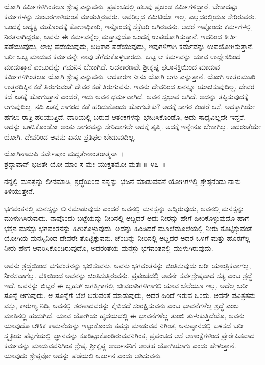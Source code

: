 ಯೋಗಿ ಕರ್ಮಿಗಳಿಗಿಂತಲೂ ಶ್ರೇಷ್ಠ ಎನ್ನುವನು. ಪ್ರಪಂಚದಲ್ಲಿ ಹಲವು ಪ್ರಚಂಡ ಕರ್ಮಿ\-ಗಳಿದ್ದಾರೆ. ಬೇಕಾದಷ್ಟು ಕರ್ಮಗಳನ್ನು ಸುಂಟರಗಾಳಿಯಂತೆ ಮಾಡುತ್ತಿರುವರು. ಅವರಿಲ್ಲದ ಕಮಿಟಿಯೇ ಇಲ್ಲ. ಎಲ್ಲದರಲ್ಲಿಯೂ ಸೇರಿರುವರು. ಒಂದಕ್ಕೆ ಅಧ್ಯಕ್ಷ ಮತ್ತೊಂದಕ್ಕೆ ಕೋಶಾಧಿಕಾರಿ, ಇನ್ನೊಂದಕ್ಕೆ ಸೆಕ್ರೆಟರಿ ಆಗಿರುವನು. ಆದರೆ ಇಷ್ಟೊಂದು ಕರ್ಮಗಳಲ್ಲಿ ನಿರತನಾಗಿದ್ದರೂ, ಅವನು ಈ ಕರ್ಮವನ್ನೆಲ್ಲ ಮತ್ತಾವುದೊ ಒಂದಕ್ಕೆ ಉಪಯೋಗಿಸುತ್ತಾನೆ. ಇದರಿಂದ ಕೀರ್ತಿ ಪಡೆಯುವುದು, ಲಾಭ ಪಡೆಯುವುದು, ಅಧಿಕಾರ ಪಡೆಯುವುದು, ಇವುಗಳಿಗಾಗಿ ಕರ್ಮವನ್ನು ಉಪಯೋಗಿಸುತ್ತಾನೆ. ಬರೀ ಒಬ್ಬ ಮಾಡುವ ಕರ್ಮವನ್ನೇ ನಾವು ತೆಗೆದುಕೊಳ್ಳಬಾರದು. ಒಬ್ಬ ಆ ಕರ್ಮವನ್ನು ಯಾವ ಉದ್ದೇಶದಿಂದ ಮಾಡುತ್ತಾನೆ ಎಂಬುದನ್ನು ಗಮನಿಸ ಬೇಕಾಗಿದೆ. ಆದಕಾರಣವೇ ಶ‍್ರೀಕೃಷ್ಣ ಫಲಾಸಕ್ತಿಯಿಂದ ಮಾಡುವ ಕರ್ಮಿಗಳಿಗಿಂತಲೂ ಯೋಗಿ ಶ್ರೇಷ್ಠ ಎನ್ನುವನು. ಆದಕಾರಣ ನೀನು ಯೋಗಿ ಆಗು ಎನ್ನುತ್ತಾನೆ. ಯೋಗಿ ಉತ್ತರಮುಖಿ ಉತ್ತರದಿಕ್ಕಿನ ಕಡೆ ತಿರುಗುವಂತೆ ದೇವರ ಕಡೆ ತಿರುಗುವನು. ಇವನು ದೇವರಿಂದ ಏನನ್ನೂ ಯಾಚಿಸುವುದಿಲ್ಲ. ದೇವರ ಕಡೆ ಏತಕ್ಕೆ ಹೋಗುತ್ತಾನೆ ಎಂದರೆ, ಇದು ಅವನ ಧರ್ಮವಾಗಿದೆ. ಅವನ ಸ್ವಭಾವ ಆಗಿದೆ. ಅದನ್ನು ತಪ್ಪಿಸುವುದಕ್ಕೆ ಆಗುವುದಿಲ್ಲ. ನದಿ ಏತಕ್ಕೆ ಸಾಗರದ ಕಡೆ ಹರಿದುಕೊಂಡು ಹೋಗಬೇಕು? ಅದಕ್ಕೆ ಸಾಗರ ಕಂಡರೆ ಆಸೆ. ಅದಕ್ಕಾಗಿಯೇ ಹಗಲು ರಾತ್ರಿ ಹರಿಯುತ್ತಿದೆ. ದಾರಿಯಲ್ಲಿ ಬರುವ ಆತಂಕಗಳನ್ನು ಭೇದಿಸಿಕೊಂಡೊ, ಅದು ಸಾಧ್ಯವಿಲ್ಲದೇ ಇದ್ದರೆ, ಅದನ್ನು ಬಳಸಿಕೊಂಡೋ ಅಂತು ಸಾಗರವನ್ನು ಸೇರಿದಾಗಲೇ ಅದಕ್ಕೆ ತೃಪ್ತಿ. ಅದಕ್ಕೆ ಇನ್ನೇನೂ ಬೇಕಾಗಿಲ್ಲ. ಅದರಂತೆಯೇ ಯೋಗಿ. ದೇವರಿಂದ ಅವನು ಏನೂ ಪ್ರತಿಫಲ ಬೇಡುವುದಿಲ್ಲ.

\begin{shloka}
ಯೋಗಿನಾಮಪಿ ಸರ್ವೇಷಾಂ ಮದ್ಗತೇನಾಂತರಾತ್ಮನಾ~।\\ಶ್ರದ್ಧಾವಾನ್ ಭಜತೇ ಯೋ ಮಾಂ ಸ ಮೇ ಯುಕ್ತತಮೋ ಮತಃ \hfill॥ ೪೭~॥
\end{shloka}

\begin{artha}
ನನ್ನಲ್ಲಿ ಮನಸ್ಸನ್ನು ಲೀನಮಾಡಿ, ಶ್ರದ್ಧೆಯಿಂದ ನನ್ನನ್ನು ಭಜನೆ ಮಾಡುವವನೆ ಯೋಗಿಗಳಲ್ಲಿ ಶ್ರೇಷ್ಠನೆಂದು ನಾನು ತಿಳಿಯುತ್ತೇನೆ.
\end{artha}

ಭಗವಂತನಲ್ಲಿ ಮನಸ್ಸನ್ನು ಲೀನಮಾಡುವುದು ಎಂದರೆ ಅವನಲ್ಲಿ ಮನಸ್ಸನ್ನು ಅದ್ದಿರುವುದು, ಅವನಲ್ಲಿ ಮನಸ್ಸನ್ನು ಮುಳುಗಿಸಿರುವುದು. ನಾವೊಂದು ಬಟ್ಟೆಯನ್ನು ನೀರಿನಲ್ಲಿ ಅದ್ದಿದರೆ ಅದು ನೀರನ್ನು ಹೇಗೆ ಹೀರಿಕೊಳ್ಳುವುದೊ ಹಾಗೆ ಭಕ್ತನ ಮನಸ್ಸು ಭಗವಂತನನ್ನು ಹೀರಿಕೊಳ್ಳುವುದು. ಅದನ್ನು ಹಿಂಡಿದರೆ ಮೂಲೆಮೂಲೆಯಲ್ಲಿ ನೀರು ತೊಟ್ಟಿಕ್ಕುವಂತೆ ಯೋಗಿಯ ಮನಸ್ಸಿನಿಂದ ದೇವರೇ ತೊಟ್ಟಿಕ್ಕುವನು. ಚೆಂಬನ್ನು ನೀರಿನಲ್ಲಿ ಅದ್ದಿದರೆ ಅದರ ಒಳಗೆ ಮತ್ತು ಹೊರಗೆಲ್ಲ ನೀರು ಹೇಗೆ ಆವರಿಸಿಕೊಂಡಿರುವುದೊ, ಅದರಂತೆಯೆ ಮನಸ್ಸು ಭಗವಂತನಲ್ಲಿ ಮುಳುಗಿರುವುದು. 

ಅವನು ಶ್ರದ್ಧೆಯಿಂದ ಭಗವಂತನನ್ನು ಭಜಿಸುವನು. ಅವನು ಭಗವಂತನನ್ನು ಚಿಂತಿಸುವುದು ಬರೀ ಯಾಂತ್ರಿಕವಾಗಲ್ಲ, ನೀರಸವಾಗಲ್ಲ. ಭಕ್ತಿಯಿಂದ ಅವನನ್ನು ಚಿಂತಿಸುತ್ತಿರುವನು. ಪ್ರಪಂಚದಲ್ಲಿ ಅವನೇ ಸರ್ವಶ್ರೇಷ್ಠವಾದ ಸತ್ಯ ಎಂಬ ಶ್ರದ್ಧೆ ಇದೆ. ಅವನನ್ನು ಬಿಟ್ಟರೆ ಈ ಬೃಹತ್ ಜಗತ್ತಿಗಾಗಲಿ, ಜೀವರಾಶಿಗಳಿಗಾಗಲಿ ಯಾವ ಬೆಲೆಯೂ ಇಲ್ಲ. ಅದೆಲ್ಲ ಬರೀ ಸೊನ್ನೆ ಆಗುವುದು. ಆ ಸೊನ್ನೆಗೆ ಬೆಲೆ ಬರುವಂತೆ ಮಾಡುವುದು, ಅದರ ಹಿಂದೆ ಇರುವ ಒಂದು. ಅವನೇ ಪವಿತ್ರತಮ ವಸ್ತು, ಕಾರುಣ್ಯ ನಿಧಿ, ಅವನಲ್ಲಿ ಶರಣಾದವರನ್ನು ಕೈಬಿಡದೆ ಸಂರಕ್ಷಿಸುವನು ಎಂಬ ಭಾವನೆಗಳೆಲ್ಲ ಶ್ರದ್ಧೆ ಎಂಬ ಮಾತಿನಲ್ಲಿ ಹುದುಗಿದೆ. ಯಾವ ಯೋಗಿಯ ಹೃದಯದಲ್ಲಿ ಈ ಭಾವನೆಗಳೆಲ್ಲ ತುಂಬಿ ತುಳುಕುತ್ತಿದೆಯೊ, ಅವನು ಯಾವುದೊ ಲೌಕಿಕ ಕಾಮನೆಯನ್ನು ಇಟ್ಟುಕೊಂಡು ತಪಸ್ಸು ಮಾಡುವವ ನಿಗಿಂತ, ಅನುಷ್ಠಾನದಲ್ಲಿ ಬಳಸದೆ ಬರೀ ಸ್ಮೃತಿಯ ಪೆಟ್ಟಿಗೆಯಲ್ಲಿ ಜ್ಞಾನ\-ವನ್ನು ಕೂಡಿಟ್ಟುಕೊಂಡಿರುವವನಿಗಿಂತ, ಪ್ರಪಂಚದ ಆಸೆ ಆಕಾಂಕ್ಷೆಗಳಿಂದ ಪ್ರೇರೇಪಿತವಾದ ಕರ್ಮವನ್ನು ಮಾಡುವವನಿಗಿಂತ ಶ್ರೇಷ್ಠ. ಶ‍್ರೀಕೃಷ್ಣ ಅರ್ಜುನನಿಗೆ ಅಂತಹ ಯೋಗಿಯಾಗು ಎಂದು ಹೇಳುತ್ತಾನೆ. ಯಾವುದು ಶ್ರೇಷ್ಠವೋ ಅದನ್ನು ಪಡೆಯಲಿ ಅರ್ಜುನ ಎಂದು ಆಶಿಸುವನು. 

